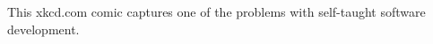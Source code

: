 \label{fig:xkcd}

This xkcd.com comic captures one of the problems with self-taught software development.
  
  
  